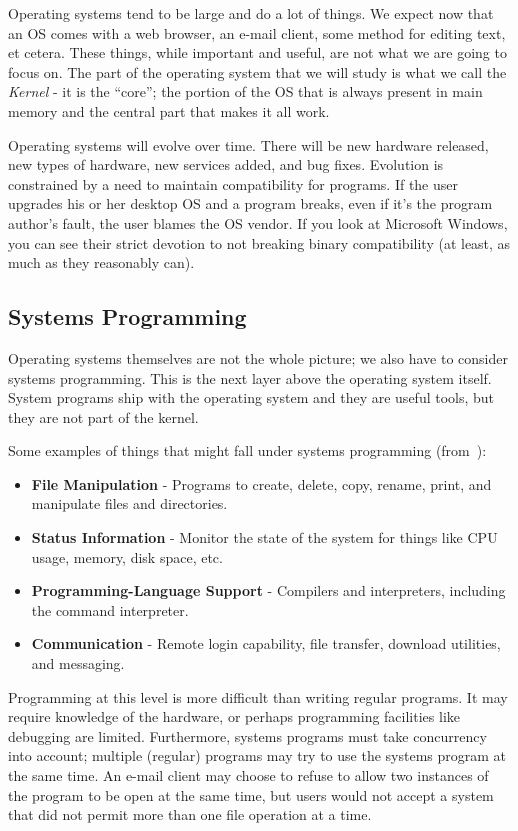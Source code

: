 Operating systems tend to be large and do a lot of things. We expect now that an OS comes with a web browser, an e-mail client, some method for editing text, et cetera. These things, while important and useful, are not what we are going to focus on. The part of the operating system that we will study is what we call the \textit{Kernel} - it is the ``core''; the portion of the OS that is always present in main memory and the central part that makes it all work.

Operating systems will evolve over time. There will be new hardware released, new types of hardware, new services added, and bug fixes. Evolution is constrained by a need to maintain compatibility for programs. If the user upgrades his or her desktop OS and a program breaks, even if it's the program author's fault, the user blames the OS vendor. If you look at Microsoft Windows, you can see their strict devotion to not breaking binary compatibility (at least, as much as they reasonably can).

\subsection*{Systems Programming}
Operating systems themselves are not the whole picture; we also have to consider systems programming. This is the next layer above the operating system itself. System programs ship with the operating system and they are useful tools, but they are not part of the kernel. 

Some examples of things that might fall under systems programming (from~\cite{osc}):

\begin{itemize}
	\item \textbf{File Manipulation} - Programs to create, delete, copy, rename, print, and manipulate files and directories.
	\item \textbf{Status Information} - Monitor the state of the system for things like CPU usage, memory, disk space, etc.
	\item \textbf{Programming-Language Support} - Compilers and interpreters, including the command interpreter.
	\item \textbf{Communication} - Remote login capability, file transfer, download utilities, and messaging.
\end{itemize}

Programming at this level is more difficult than writing regular programs. It may require knowledge of the hardware, or perhaps programming facilities like debugging are limited. Furthermore, systems programs must take concurrency into account; multiple (regular) programs may try to use the systems program at the same time. An e-mail client may choose to refuse to allow two instances of the program to be open at the same time, but users would not accept a system that did not permit more than one file operation at a time. 


